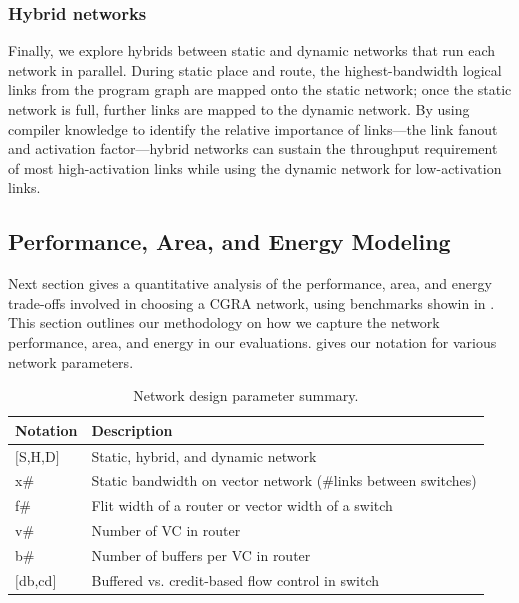 \subsubsection{Hybrid networks}
Finally, we explore hybrids between static and dynamic networks that run each network in parallel. 
During static place and route, the highest-bandwidth logical links from the program graph are mapped onto the static network; once the static network is full, further links are mapped to the dynamic network.
By using compiler knowledge to identify the relative importance of links---the link fanout and activation factor---hybrid networks can sustain the throughput requirement of most high-activation links while using the dynamic network for low-activation links.

\subsection{Performance, Area, and Energy Modeling} \label{sec:net_char}

Next section gives a quantitative analysis of the performance, area, and energy trade-offs involved 
in choosing a CGRA network, using benchmarks showin in .
This section outlines our methodology on how we capture the network 
performance, area, and energy in our evaluations.
 gives our notation for various network parameters.

\begin{table}
\footnotesize
\begin{tabular*}{\columnwidth}{p{1cm} p{7cm}}
  \bottomrule
  \textbf{Notation} & \textbf{Description} \\\midrule
  $[$S,H,D$]$ & Static, hybrid, and dynamic network \\\midrule
  x\# & Static bandwidth on vector network (\#links between switches) \\\midrule
  f\# & Flit width of a router or vector width of a switch \\\midrule
  v\# & Number of VC in router \\\midrule
  b\# & Number of buffers per VC in router \\\midrule
  $[$db,cd$]$ & Buffered vs. credit-based flow control in switch \\\midrule
\end{tabular*}
\caption{Network design parameter summary.}
\label{tab:notation}
\end{table}

